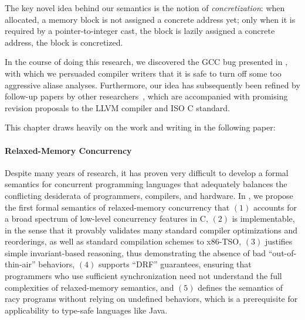 The key novel idea behind our semantics is the notion of \emph{concretization}: when allocated, a
memory block is not assigned a concrete address yet; only when it is required by a
pointer-to-integer cast, the block is lazily assigned a concrete address, \ie{} the block is
concretized.

In the course of doing this research, we discovered the GCC bug presented in
, with which we persuaded compiler writers that it is safe to turn off
some too aggressive aliase analyses.  Furthermore, our idea has subsequently been refined by
follow-up papers by other researchers~\cite{intptrcast-oopsla,intptrcast-popl}, which are
accompanied with promising revision proposals to the LLVM compiler and ISO C standard.



This chapter draws heavily on the work and writing in the following paper:


\paragraph{Relaxed-Memory Concurrency}

Despite many years of research, it has proven very difficult to develop a formal semantics for
concurrent programming languages that adequately balances the conflicting desiderata of programmers,
compilers, and hardware.  In , we propose the first formal semantics of
relaxed-memory concurrency that $(1)$ accounts for a broad spectrum of low-level concurrency
features in C, $(2)$ is implementable, in the sense that it provably validates many standard
compiler optimizations and reorderings, as well as standard compilation schemes to x86-TSO,
$(3)$ justifies simple invariant-based reasoning, thus demonstrating the absence of bad
``out-of-thin-air'' behaviors, $(4)$ supports ``DRF'' guarantees, ensuring that programmers who use
sufficient synchronization need not understand the full complexities of relaxed-memory semantics,
and $(5)$ defines the semantics of racy programs without relying on undefined behaviors, which is a
prerequisite for applicability to type-safe languages like Java.

